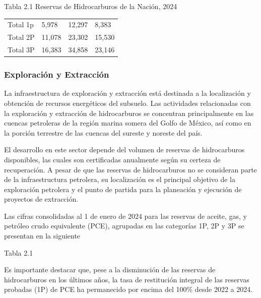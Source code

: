 \documentclass{sener2025}
\begin{document}
\begin{tabladoradoCorto}
  \caption{Tabla 2.1 Reservas de Hidrocarburos de la Nación, 2024}
  \label{tab:tabla_2_1_reservas_de_hidrocar}
  \begin{tabularx}{\textwidth}{Vvvv}
    \toprule
      &  &  &  \\
    \midrule
    Total 1p & 5,978 & 12,297 & 8,383 \\
    Total 2P & 11,078 & 23,302 & 15,530 \\
    Total 3P & 16,383 & 34,858 & 23,146 \\
    \bottomrule
  \end{tabularx}
\end{tabladoradoCorto}
\vspace{-4pt}



\subsubsection{Exploración y Extracción}

La infraestructura de exploración y extracción está destinada a la localización y obtención de recursos energéticos del subsuelo. Las actividades relacionadas con la exploración y extracción de hidrocarburos se concentran principalmente en las cuencas petroleras de la región marina somera del Golfo de México, así como en la porción terrestre de las cuencas del sureste y noreste del país.

El desarrollo en este sector depende del volumen de reservas de hidrocarburos disponibles, las cuales son certificadas anualmente según su certeza de recuperación. A pesar de que las reservas de hidrocarburos no se consideran parte de la infraestructura petrolera, su localización es el principal objetivo de la exploración petrolera y el punto de partida para la planeación y ejecución de proyectos de extracción.

Las cifras consolidadas al 1 de enero de 2024 para las reservas de aceite, gas, y petróleo crudo equivalente (PCE), agrupadas en las categorías 1P, 2P y 3P se presentan en la siguiente

Tabla 2.1

Es importante destacar que, pese a la disminución de las reservas de hidrocarburos en los últimos años, la tasa de restitución integral de las reservas probadas (1P) de PCE ha permanecido por encima del 100\% desde 2022 a 2024.
\end{document}
